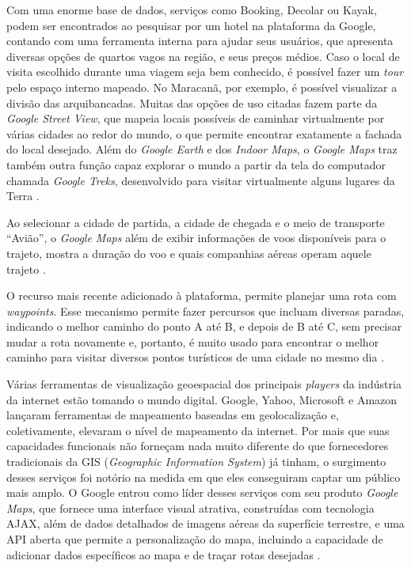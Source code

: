 Com uma enorme base de dados, serviços como Booking, Decolar ou Kayak, podem ser encontrados ao pesquisar por um hotel na plataforma da Google, contando com uma ferramenta interna para ajudar seus usuários, que apresenta diversas opções de quartos vagos na região, e seus preços médios. Caso o local de visita escolhido durante uma viagem seja bem conhecido, é possível fazer um \textit{tour} pelo espaço interno mapeado. No Maracanã, por exemplo, é possível visualizar a divisão das arquibancadas. Muitas das opções de uso citadas fazem parte da \textit{Google Street View}, que mapeia locais possíveis de caminhar virtualmente por várias cidades ao redor do mundo, o que permite encontrar exatamente a fachada do local desejado. Além do \textit{Google Earth} e dos \textit{Indoor Maps}, o \textit{Google Maps} traz também outra função capaz explorar o mundo a partir da tela do computador chamada \textit{Google Treks}, desenvolvido para visitar virtualmente alguns lugares da Terra \cite{google:2019}.

Ao selecionar a cidade de partida, a cidade de chegada e o meio de transporte “Avião”, o \textit{Google Maps} além de exibir informações de voos disponíveis para o trajeto, mostra a duração do voo e quais companhias aéreas operam aquele trajeto \cite{google:2019}. 

O recurso mais recente adicionado à plataforma, permite planejar uma rota com \textit{waypoints}. Esse mecanismo permite fazer percursos que incluam diversas paradas, indicando o melhor caminho do ponto A até B, e depois de B até C, sem precisar mudar a rota novamente e, portanto, é muito usado para encontrar o melhor caminho para visitar diversos pontos turísticos de uma cidade no mesmo dia \cite{google:2019}.

Várias ferramentas de visualização geoespacial dos principais \textit{players} da indústria da internet estão tomando o mundo digital. Google, Yahoo, Microsoft e Amazon lançaram ferramentas de mapeamento baseadas em geolocalização e, coletivamente, elevaram o nível de mapeamento da internet. Por mais que suas capacidades funcionais não forneçam nada muito diferente do que fornecedores tradicionais da GIS (\textit{Geographic Information System}) já tinham, o surgimento desses serviços foi notório na medida em que eles conseguiram captar um público mais amplo. O Google entrou como líder desses serviços com seu produto \textit{Google Maps}, que fornece uma interface visual atrativa, construídas com tecnologia AJAX, além de dados detalhados de imagens aéreas da superfície terrestre, e uma API aberta que permite a personalização do mapa, incluindo a capacidade de adicionar dados específicos ao mapa e de traçar rotas desejadas \cite{geospatial:2009}.

